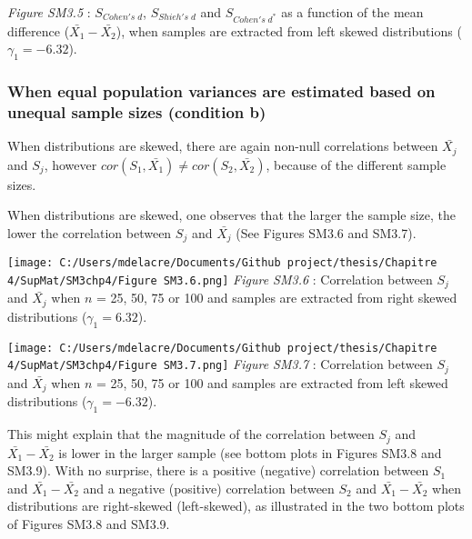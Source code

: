 \documentclass[
  english,
  man,mask,floatsintext]{apa6}
\begin{document}
\setlength\parindent{0pt}\emph{Figure SM3.5} : \(S_{Cohen's \; d}\), \(S_{Shieh's \; d}\) and \(S_{Cohen's \; d^*}\) as a function of the mean difference (\(\bar{X_1}-\bar{X_2}\)), when samples are extracted from left skewed distributions (\(\gamma_1 = -6.32\)).

\newpage

\hypertarget{when-equal-population-variances-are-estimated-based-on-unequal-sample-sizes-condition-b}{%
\subsubsection{When equal population variances are estimated based on unequal sample sizes (condition b)}\label{when-equal-population-variances-are-estimated-based-on-unequal-sample-sizes-condition-b}}

\setlength\parindent{24pt}When distributions are skewed, there are again non-null correlations between \(\bar{X_j}\) and \(S_j\), however \(cor(S_1,\bar{X_1}) \neq cor(S_2,\bar{X_2})\), because of the different sample sizes.

When distributions are skewed, one observes that the larger the sample size, the lower the correlation between \(S_j\) and \(\bar{X_j}\) (See Figures SM3.6 and SM3.7).

\texttt{[image: C:/Users/mdelacre/Documents/Github project/thesis/Chapitre 4/SupMat/SM3chp4/Figure SM3.6.png]}
\setlength\parindent{0pt}\emph{Figure SM3.6} : Correlation between \(S_j\) and \(\bar{X_j}\) when \(n\) = 25, 50, 75 or 100 and samples are extracted from right skewed distributions (\(\gamma_1 = 6.32\)).

\newpage

\texttt{[image: C:/Users/mdelacre/Documents/Github project/thesis/Chapitre 4/SupMat/SM3chp4/Figure SM3.7.png]}
\emph{Figure SM3.7} : Correlation between \(S_j\) and \(\bar{X_j}\) when \(n\) = 25, 50, 75 or 100 and samples are extracted from left skewed distributions (\(\gamma_1 = -6.32\)).

\newpage

\setlength\parindent{24pt}This might explain that the magnitude of the correlation between \(S_j\) and \(\bar{X_1}-\bar{X_2}\) is lower in the larger sample (see bottom plots in Figures SM3.8 and SM3.9). With no surprise, there is a positive (negative) correlation between \(S_1\) and \(\bar{X_1}-\bar{X_2}\) and a negative (positive) correlation between \(S_2\) and \(\bar{X_1}-\bar{X_2}\) when distributions are right-skewed (left-skewed), as illustrated in the two bottom plots of Figures SM3.8 and SM3.9.
\end{document}
